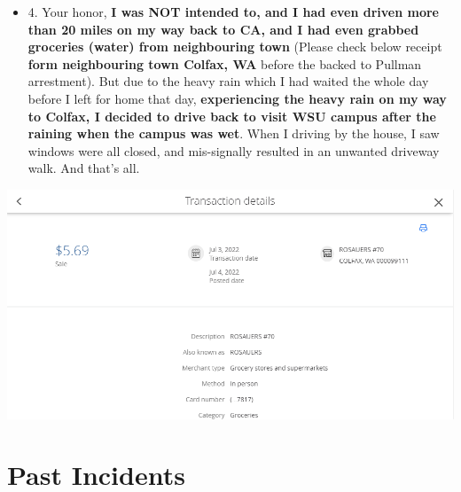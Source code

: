 \documentclass[9pt, b5paper]{article}
\begin{document}
\begin{itemize}
\item 4. Your honor, \textbf{I was NOT intended to, and I had even driven more than 20 miles on my way back to CA, and I had even grabbed groceries (water) from neighbouring town} (Please check below receipt \textbf{form neighbouring town Colfax, WA} before the backed to Pullman arrestment). But due to the heavy rain which I had waited the whole day before I left for home that day, \textbf{experiencing the heavy rain on my way to Colfax, I decided to drive back to visit WSU campus after the raining when the campus was wet}. When I driving by the house, I saw windows were all closed, and mis-signally resulted in an unwanted driveway walk. And that's all.
\end{itemize}

\includegraphics[width=.9\linewidth]{./pic/dearCousin_20220919_201117.png}
\section{Past Incidents}
\label{sec-4}
\end{document}
